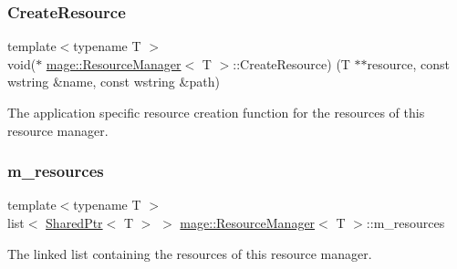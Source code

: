 \subsubsection{\texorpdfstring{Create\+Resource}{CreateResource}}
{\footnotesize\ttfamily template$<$typename T $>$ \\
void($\ast$ \hyperlink{classmage_1_1_resource_manager}{mage\+::\+Resource\+Manager}$<$ T $>$\+::Create\+Resource) (T $\ast$$\ast$resource, const wstring \&name, const wstring \&path)\hspace{0.3cm}{\ttfamily [private]}}

The application specific resource creation function for the resources of this resource manager. \hypertarget{classmage_1_1_resource_manager_aff542b1b858650c5bbb3c6d0ceaa5a5d}{}\label{classmage_1_1_resource_manager_aff542b1b858650c5bbb3c6d0ceaa5a5d} 
\subsubsection{\texorpdfstring{m\+\_\+resources}{m\_resources}}
{\footnotesize\ttfamily template$<$typename T $>$ \\
list$<$ \hyperlink{namespacemage_a1e01ae66713838a7a67d30e44c67703e}{Shared\+Ptr}$<$ T $>$ $>$ \hyperlink{classmage_1_1_resource_manager}{mage\+::\+Resource\+Manager}$<$ T $>$\+::m\+\_\+resources\hspace{0.3cm}{\ttfamily [private]}}

The linked list containing the resources of this resource manager. 